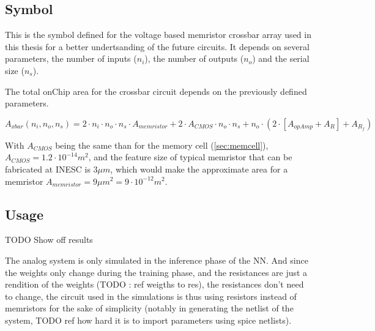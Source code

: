 \subsection{Symbol}
This is the symbol defined for the voltage based memristor crossbar array used in this thesis for a better undertsanding of the future circuits. It depends on several parameters, the number of inputs ($n_i$), the number of outputs ($n_o$) and the serial size ($n_s$).


The total onChip area for the crossbar circuit depends on the previously defined parameters.

\begin{equation}
  A_{xbar}(n_i,n_o,n_s)=2\cdot n_i\cdot n_o \cdot n_s\cdot A_{memristor}+2\cdot A_{CMOS}\cdot n_o\cdot n_s +n_o\cdot(2\cdot[A_{opAmp}+A_R]+A_{R_f})
\end{equation}

With $A_{CMOS}$ being the same than for the memory cell (\cref{sec:memcell}), $A_{CMOS}=1.2\cdot 10^{-14}m^2$, and the feature size of typical memristor that can be fabricated at INESC is $3\mu m$, which would make the approximate area for a memristor $A_{memristor}=9\mu m^2=9\cdot 10^{-12} m^2$.%

\subsection{Usage}

TODO Show off results

The analog system is only simulated in the inference phase of the \ac{NN}. And since the weights only change during the training phase, and the resistances are just a rendition of the weights (TODO : ref weigths to res), the resistances don't need to change, the circuit used in the simulations is thus using resistors instead of memristors for the sake of simplicity (notably in generating the netlist of the system, TODO ref how hard it is to import parameters using spice netlists).
